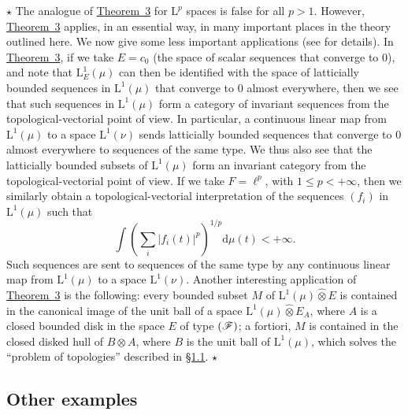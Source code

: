 \documentclass{article}
\theoremstyle{plain}
\newcommand{\aster}[1]{$\star${#1}$\star$}
\newcommand{\LL}{\mathrm{L}}
\renewcommand{\ll}{\ell}
\newcommand{\FF}{\mbox{\normalfont($\mathscr{F}$)}}
\newcommand{\hotimes}{\widehat{\otimes}}
\newcommand{\dd}{\mathrm{d}}
\begin{document}
\aster{%
  The analogue of \hyperref[1.theorem3]{Theorem~3} for $\LL^p$ spaces is false for all $p>1$.
  However, \hyperref[1.theorem3]{Theorem~3} applies, in an essential way, in many important places in the theory outlined here.
  We now give some less important applications (see \cite[chap.~1, \S2, n\textsuperscript{o}~2]{PTT} for details).
  In \hyperref[1.theorem3]{Theorem~3}, if we take $E=c_0$ (the space of scalar sequences that converge to $0$), and note that $\LL_E^1(\mu)$ can then be identified with the space of latticially bounded sequences in $\LL^1(\mu)$ that converge to $0$ almost everywhere, then we see that such sequences in $\LL^1(\mu)$ form a category of invariant sequences from the topological-vectorial point of view.
  In particular, a continuous linear map from $\LL^1(\mu)$ to a space $\LL^1(\nu)$ sends latticially bounded sequences that converge to $0$ almost everywhere to sequences of the same type.
  We thus also see that the latticially bounded subsets of $\LL^1(\mu)$ form an invariant category from the topological-vectorial point of view.
  If we take $F=\ll^p$, with $1\leq p<+\infty$, then we similarly obtain a topological-vectorial interpretation of the sequences $(f_i)$ in $\LL^1(\mu)$ such that
  \[
    \int \left(
      \sum_i |f_i(t)|^p
    \right)^{1/p}
    \dd\mu(t) < +\infty.
  \]
  Such sequences are sent to sequences of the same type by any continuous linear map from $\LL^1(\mu)$ to a space $\LL^1(\nu)$.
  Another interesting application of \hyperref[1.theorem3]{Theorem~3} is the following: every bounded subset $M$ of $\LL^1(\mu)\hotimes E$ is contained in the canonical image of the unit ball of a space $\LL^1(\mu)\hotimes E_A$, where $A$ is a closed bounded disk in the space $E$ of type $\FF$;
  a fortiori, $M$ is contained in the closed disked hull of $B\otimes A$, where $B$ is the unit ball of $\LL^1(\mu)$, which solves the ``problem of topologies'' described in \hyperref[1.1]{\S1.1}.
}


\subsection{Other examples}
\label{1.4}
\end{document}

